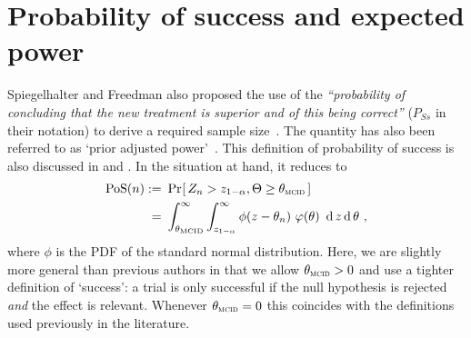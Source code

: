 \documentclass{article}
\renewcommand{\Pr}{\operatorname{Pr}}
\begin{document}
\section{Probability of success and expected power}
\label{sec:pos}
\newcommand{\PoS}{\operatorname{PoS}}

Spiegelhalter and Freedman also proposed the use of the \textit{``probability of concluding that the new treatment is superior and of this being correct''} ($P_{Ss}$ in their notation) to derive a required sample size~\citep{spiegelhalter1986}.
The quantity has also been referred to as `prior adjusted power'~\citep{spiegelhalter-2004,shao-2008}.
This definition of probability of success is also discussed in \citet{liu-2010} and \citet{ciarleglio-2015}.
In the situation at hand, it reduces to
\begin{align}
    \PoS(n) :=&\ \Pr_{}[\,Z_n > \criticalvalue, \Theta \geq \mcid\,] \\
          =&\ \int_{\mcid}^\infty \int_{\criticalvalue}^\infty \phi(z - \theta_n)\ \varphi(\theta)\ \operatorname{d}z\operatorname{d}\theta  \ ,
\end{align}
where $\phi$ is the PDF of the standard normal distribution.
Here, we are slightly more general than previous authors in that
we allow $\mcid>0$ and use a tighter definition of `success': a trial is only successful if the null hypothesis is rejected \emph{and} the effect is relevant.
Whenever $\mcid=0$ this coincides with the definitions used previously in the literature.
\end{document}
